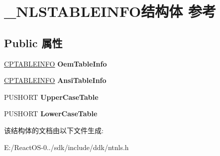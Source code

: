 \hypertarget{struct___n_l_s_t_a_b_l_e_i_n_f_o}{}\section{\+\_\+\+N\+L\+S\+T\+A\+B\+L\+E\+I\+N\+F\+O结构体 参考}
\label{struct___n_l_s_t_a_b_l_e_i_n_f_o}
\subsection*{Public 属性}
\begin{DoxyCompactItemize}
\item 
\mbox{\label{struct___n_l_s_t_a_b_l_e_i_n_f_o_a56a866e9457021a280b42cec383df4bd}} 
\hyperlink{struct___c_p_t_a_b_l_e_i_n_f_o}{C\+P\+T\+A\+B\+L\+E\+I\+N\+FO} {\bfseries Oem\+Table\+Info}
\item 
\mbox{\label{struct___n_l_s_t_a_b_l_e_i_n_f_o_a23afda121c310a7023b178ac1ff249ed}} 
\hyperlink{struct___c_p_t_a_b_l_e_i_n_f_o}{C\+P\+T\+A\+B\+L\+E\+I\+N\+FO} {\bfseries Ansi\+Table\+Info}
\item 
\mbox{\label{struct___n_l_s_t_a_b_l_e_i_n_f_o_ab087c4ac568fe26f012efd2548a3b96b}} 
P\+U\+S\+H\+O\+RT {\bfseries Upper\+Case\+Table}
\item 
\mbox{\label{struct___n_l_s_t_a_b_l_e_i_n_f_o_a7ba57497a63c493a819c6f12bbe0931d}} 
P\+U\+S\+H\+O\+RT {\bfseries Lower\+Case\+Table}
\end{DoxyCompactItemize}


该结构体的文档由以下文件生成\+:\begin{DoxyCompactItemize}
\item 
E\+:/\+React\+O\+S-\/0../sdk/include/ddk/ntnls.\+h\end{DoxyCompactItemize}
